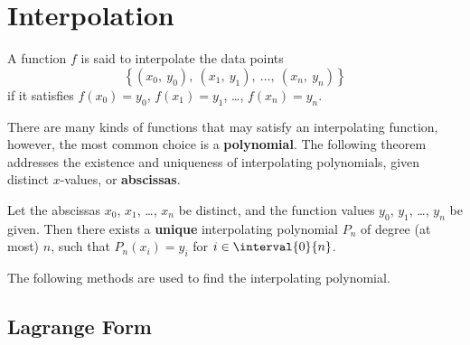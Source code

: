 \documentclass{article}
\begin{document}
\section{Interpolation}
\begin{definition}
    A function \(f\) is said to interpolate the data points
    \begin{equation*}
        \left\{ \left( x_0,\: y_0 \right),\: \left( x_1,\: y_1 \right),\: \dots,\: \left( x_n,\: y_n \right) \right\}
    \end{equation*}
    if it satisfies \(f\left( x_0 \right) = y_0\), \(f\left( x_1 \right) = y_1\), \dots,  \(f\left( x_n \right) = y_n\).
\end{definition}
There are many kinds of functions that may satisfy an interpolating
function, however, the most common choice is a
\textbf{polynomial}.
The following theorem addresses the existence and uniqueness of
interpolating polynomials, given distinct \(x\)-values, or
\textbf{abscissas}.
\begin{theorem}
    Let the abscissas \(x_0\), \(x_1\), \dots, \(x_n\) be distinct, and
    the function values \(y_0\), \(y_1\), \dots, \(y_n\) be given. Then
    there exists a \textbf{unique} interpolating polynomial \(P_n\) of
    degree (at most) \(n\), such that \(P_n\left( x_i \right) = y_i\)
    for \(i \in \interval{0}{n}\).
\end{theorem}
The following methods are used to find the interpolating polynomial.
\subsection{Lagrange Form}
\end{document}
